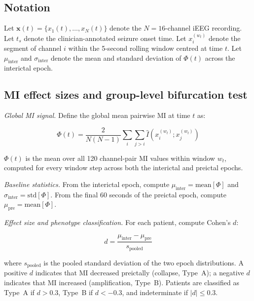 \documentclass[a4paper,fleqn]{cas-dc}
\begin{document}
\subsection{Notation}

Let $\mathbf{x}(t) = \{x_1(t), \ldots, x_N(t)\}$ denote the
$N = 16$-channel iEEG recording.
%
Let $t_s$ denote the clinician-annotated seizure onset time.
%
Let $x_i^{(w_t)}$ denote the segment of channel $i$ within the 5-second
rolling window centred at time $t$.
%
Let $\mu_{\text{inter}}$ and $\sigma_{\text{inter}}$ denote the mean
and standard deviation of $\Phi(t)$ across the interictal epoch.

\subsection{MI effect sizes and group-level bifurcation test}
\label{sec:bifurcation}

\textit{Global MI signal.}
Define the global mean pairwise MI at time $t$ as:

\begin{equation}
  \Phi(t) = \frac{2}{N(N-1)}
            \sum_{i} \sum_{j > i}
            \hat{I}\!\left(x_i^{(w_t)}; x_j^{(w_t)}\right)
  \label{eq:phi}
\end{equation}

$\Phi(t)$ is the mean over all 120 channel-pair MI values within window
$w_t$, computed for every window step across both the interictal and
preictal epochs.

\textit{Baseline statistics.}
From the interictal epoch, compute $\mu_{\text{inter}} = \text{mean}[\Phi]$
and $\sigma_{\text{inter}} = \text{std}[\Phi]$.
%
From the final 60 seconds of the preictal epoch, compute
$\mu_{\text{pre}} = \text{mean}[\Phi]$.

\textit{Effect size and phenotype classification.}
For each patient, compute Cohen's $d$:

\begin{equation}
  d = \frac{\mu_{\text{inter}} - \mu_{\text{pre}}}{s_{\text{pooled}}}
  \label{eq:cohend}
\end{equation}

where $s_{\text{pooled}}$ is the pooled standard deviation of the two
epoch distributions.
%
A positive $d$ indicates that MI decreased preictally (collapse,
Type~A); a negative $d$ indicates that MI increased (amplification,
Type~B).
%
Patients are classified as Type~A if $d > 0.3$, Type~B if $d < -0.3$,
and indeterminate if $|d| \leq 0.3$.
\end{document}
